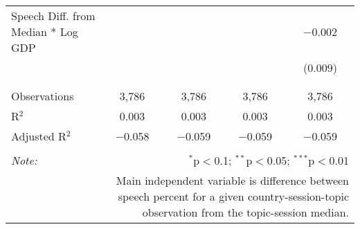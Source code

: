 \begin{table}[!htbp]
\begin{tabular}{@{\extracolsep{5pt}}lcccc}
 Speech Diff. from Median * Log GDP &  &  &  & $-$0.002 \\ 
  &  &  &  & (0.009) \\ 
  & & & & \\ 
\hline \\[-1.8ex] 
Observations & 3,786 & 3,786 & 3,786 & 3,786 \\ 
R$^{2}$ & 0.003 & 0.003 & 0.003 & 0.003 \\ 
Adjusted R$^{2}$ & $-$0.058 & $-$0.059 & $-$0.059 & $-$0.059 \\ 
\hline 
\hline \\[-1.8ex] 
\textit{Note:}  & \multicolumn{4}{r}{$^{*}$p$<$0.1; $^{**}$p$<$0.05; $^{***}$p$<$0.01} \\ 
 & \multicolumn{4}{r}{Main independent variable is difference between speech percent for a given country-session-topic observation from the topic-session median.} \\ 
\end{tabular} 
\end{table} 
